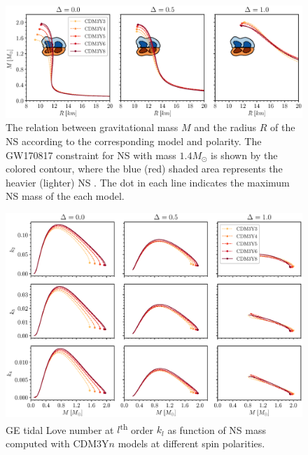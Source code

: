 \begin{figure}[ht!]
        \centering
        \includegraphics[width=\textwidth]{fig/MR.eps}
        \caption{The relation between gravitational mass $M$ and the radius $R$ of the \gls{NS} according to the corresponding model and polarity. The GW170817 constraint for \gls{NS} with mass $1.4M_\odot$ is shown by the colored contour, where the blue (red) shaded area represents the heavier (lighter) \gls{NS} \citep{abbott2018gw170817}. The dot in each line indicates the maximum \gls{NS} mass of the each model.}
        \label{fig:mr}
\end{figure} 
\begin{figure}[ht!]
        \centering
        \includegraphics[width=\textwidth]{fig/kl.eps}
        \caption{\gls{GE} tidal Love number at $l$\textsuperscript{th} order $k_l$ as function of \gls{NS} mass computed with CDM3Y$n$ models at different spin polarities.}
        \label{fig:kl}
\end{figure} 
